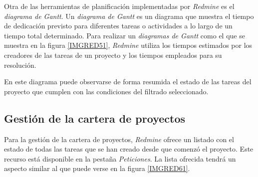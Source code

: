 \documentclass[11pt,a4paper,spanish,twoside]{report}
\begin{document}
	Otra de las herramientas de planificación implementadas por \emph{Redmine}
	es el \emph{diagrama de Gantt}. Un \emph{diagrama de Gantt} es un diagrama
	que muestra el tiempo de dedicación previsto para diferentes tareas o
	actividades a lo largo de un tiempo total determinado. Para realizar
	un \emph{diagramas de Gantt} como el que se muestra en la figura
	\ref{IMGRED51}, \emph{Redmine} utiliza los tiempos estimados por los
	creadores de las tareas de un proyecto y los tiempos	empleados para su
	resolución.


	En este diagrama puede observarse de forma resumida el estado de las tareas
	del proyecto que cumplen con las condiciones del filtrado seleccionado.

	\subsection{Gestión de la cartera de proyectos}
	Para la gestión de la cartera de proyectos, \emph{Redmine} ofrece un listado
	con el estado de todas las tareas que se han creado desde que comenzó el
	proyecto. Este recurso está disponible en la pestaña \emph{Peticiones}.
	La lista ofrecida tendrá un aspecto similar al que puede verse en la
	figura \ref{IMGRED61}. 

\end{document}

